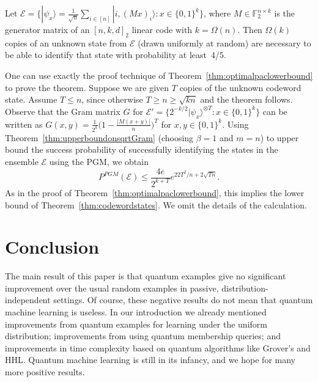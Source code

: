 \documentclass[twoside,11pt]{article}
\newcommand{\ket}[1]{|#1\rangle}
\newcommand{\F}{\ensuremath{\mathbb{F}}}
\newcommand{\E}{\mathcal{E}}
\def\01{\{0,1\}}
\begin{document}
\begin{theorem}\label{thm:codewordstates}
	Let $\E=\{\ket{\psi_x}=\frac{1}{\sqrt{n}} \sum_{i\in [n]} \ket{i,(Mx)_i}:x\in \01^k\}$, where $M\in \F^{n\times k}_2$ is the generator matrix of an $[n,k,d]_2$ linear code with $k=\Omega(n)$. Then $\Omega(k)$ copies of an unknown state from $\E$ (drawn uniformly at random) are necessary to be able to identify that state with probability at least~$4/5$.
\end{theorem}

One can use exactly the proof technique of Theorem~\ref{thm:optimalpaclowerbound} to prove the theorem. Suppose we are given $T$ copies of the unknown codeword state. Assume $T\leq n$, since otherwise $T\geq n\geq \sqrt{kn}$ and the theorem follows. Observe that the Gram matrix $G$ for $\E'=\{2^{-k/2}\ket{\psi_x}^{\otimes T}:x\in \01^k\}$ can be written as $G(x,y)=\frac{1}{2^k}\Big(1-\frac{|M(x+y)|}{n}\Big)^T$ for $x,y\in \01^k$. Using Theorem~\ref{thm:upperboundonsqrtGram} (choosing $\beta=1$ and $m=n$) to upper bound the success probability of successfully identifying the states in the ensemble $\E$ using the PGM, we obtain
$$
P^{PGM}(\E)\leq  \frac{4e}{2^{k+T}} e^{22T^2/n+2\sqrt{Tn}}  .
$$
As in the proof of Theorem~\ref{thm:optimalpaclowerbound}, this implies the lower bound of Theorem~\ref{thm:codewordstates}. We omit the details of the calculation.



\section{Conclusion}
\label{section:conclusion}
The main result of this paper is that quantum examples give no significant improvement over the usual random examples in passive, distribution-independent settings. Of course, these negative results do not mean that quantum machine learning is useless.  In our introduction we already mentioned improvements from quantum examples for learning under the uniform distribution; improvements from using quantum membership queries; and improvements in time complexity based on quantum algorithms like Grover's and HHL. Quantum machine learning is still in its infancy, and we hope for many more positive results.
\end{document}
